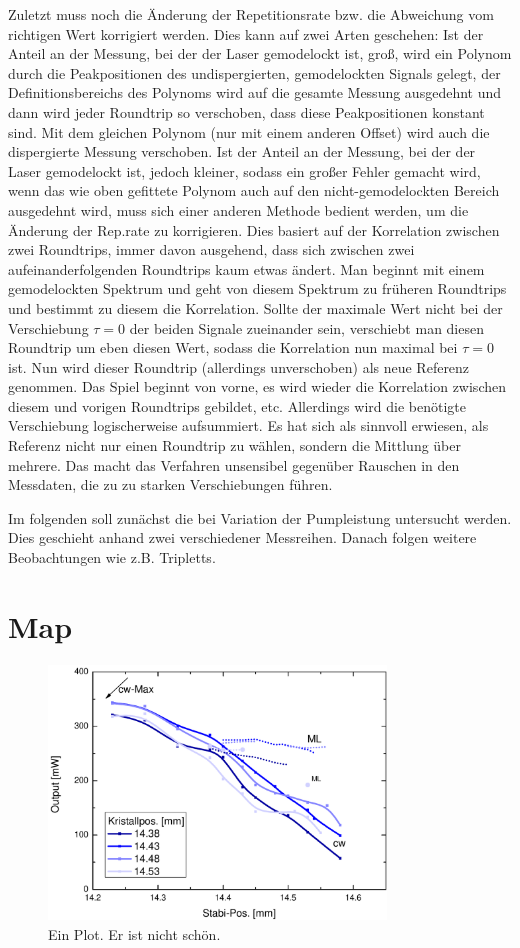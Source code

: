 \documentclass[bachelor,       %
               twoside,        %
               BCOR10mm,       %
               english,ngerman, %
               ]{GAUBM}
\begin{document}
Zuletzt muss noch die Änderung der Repetitionsrate bzw. die Abweichung vom richtigen Wert korrigiert werden.
Dies kann auf zwei Arten geschehen:
Ist der Anteil an der Messung, bei der der Laser gemodelockt ist, groß, wird ein Polynom durch die Peakpositionen des undispergierten, gemodelockten Signals gelegt, der Definitionsbereichs des Polynoms wird auf die gesamte Messung ausgedehnt und dann wird jeder Roundtrip so verschoben, dass diese Peakpositionen konstant sind.
Mit dem gleichen Polynom (nur mit einem anderen Offset) wird auch die dispergierte Messung verschoben.
Ist der Anteil an der Messung, bei der der Laser gemodelockt ist, jedoch kleiner, sodass ein großer Fehler gemacht wird, wenn das wie oben gefittete Polynom auch auf den nicht-gemodelockten Bereich ausgedehnt wird, muss sich einer anderen Methode bedient werden, um die Änderung der Rep.rate zu korrigieren.
Dies basiert auf der Korrelation zwischen zwei Roundtrips, immer davon ausgehend, dass sich zwischen zwei aufeinanderfolgenden Roundtrips kaum etwas ändert.
Man beginnt mit einem gemodelockten Spektrum und geht von diesem Spektrum zu früheren Roundtrips und bestimmt zu diesem die Korrelation.
Sollte der maximale Wert nicht bei der Verschiebung $\tau=0$ der beiden Signale zueinander sein, verschiebt man diesen Roundtrip um eben diesen Wert, sodass die Korrelation nun maximal bei $\tau=0$ ist.
Nun wird dieser Roundtrip (allerdings unverschoben) als neue Referenz genommen.
Das Spiel beginnt von vorne, es wird wieder die Korrelation zwischen diesem und vorigen Roundtrips gebildet, etc.
Allerdings wird die benötigte Verschiebung logischerweise aufsummiert.
Es hat sich als sinnvoll erwiesen, als Referenz nicht nur einen Roundtrip zu wählen, sondern die Mittlung über mehrere.
Das macht das Verfahren unsensibel gegenüber Rauschen in den Messdaten, die zu zu starken Verschiebungen führen.

Im folgenden soll zunächst die bei Variation der Pumpleistung untersucht werden.
Dies geschieht anhand zwei verschiedener Messreihen.
Danach folgen weitere Beobachtungen wie z.B. Tripletts.

\section{Map}
\begin{figure}[!htb]
	\centering
	\includegraphics[width=0.8\textwidth]{figures/map.pdf}
	\caption{Ein Plot. Er ist nicht schön.}
	\label{fig:map}
\end{figure}
\end{document}
